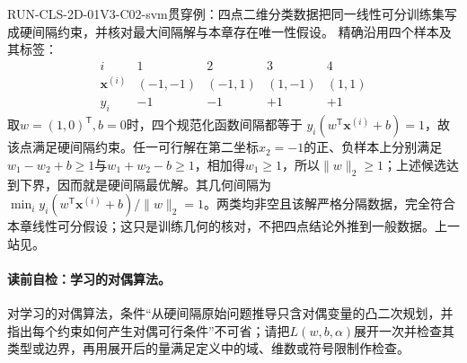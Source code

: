 
\begin{SLRunningExample}{RUN-CLS-2D-01}{V3-C02-svm}{贯穿例：四点二维分类数据}{把同一线性可分训练集写成硬间隔约束，并核对最大间隔解与本章存在唯一性假设。}
精确沿用四个样本及其标签：
\[
\begin{array}{c|cccc}
i&1&2&3&4\\ \hline
\boldsymbol{x}^{(i)}&(-1,-1)&(-1,1)&(1,-1)&(1,1)\\
y_i&-1&-1&+1&+1
\end{array}
\]
取$w=(1,0)^{\mathsf T},b=0$时，四个规范化函数间隔都等于
$y_i(w^{\mathsf T}\boldsymbol{x}^{(i)}+b)=1$，故该点满足硬间隔约束。任一可行解在第二坐标$x_2=-1$的正、负样本上分别满足
$w_1-w_2+b\geq1$与$w_1+w_2-b\geq1$，相加得$w_1\geq1$，所以$\lVert w\rVert_2\geq1$；上述候选达到下界，因而就是硬间隔最优解。其几何间隔为
$\min_i y_i(w^{\mathsf T}\boldsymbol{x}^{(i)}+b)/\lVert w\rVert_2=1$。两类均非空且该解严格分隔数据，完全符合本章线性可分假设；这只是训练几何的核对，不把四点结论外推到一般数据。上一站见。
\end{SLRunningExample}


\paragraph{读前自检：学习的对偶算法。}对学习的对偶算法，条件“从硬间隔原始问题推导只含对偶变量的凸二次规划，并指出每个约束如何产生对偶可行条件”不可省；请把$L(w,b,\alpha)$展开一次并检查其类型或边界，再用展开后的量满足定义中的域、维数或符号限制作检查。\par


